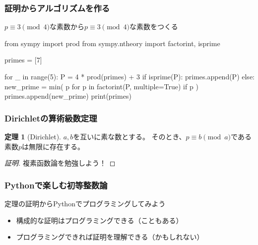 \documentclass[dvipdfmx,11pt,notheorems]{beamer}
\theoremstyle{definition}
\newtheorem{theorem}{定理}
\begin{document}
\begin{frame}[fragile]\frametitle{証明からアルゴリズムを作る}

\begin{block}{$p \equiv 3 \pmod{4}$な素数から$p \equiv 3 \pmod{4}$な素数をつくる}
\begin{pycode}
from sympy import prod
from sympy.ntheory import factorint, isprime

primes = [7]

for _ in range(5):
    P = 4 * prod(primes) + 3
    if isprime(P):
        primes.append(P)
    else:
        new_prime = min(
            p
            for p in factorint(P, multiple=True)
            if p %
        )
        primes.append(new_prime)
print(primes)
\end{pycode}
\end{block}

\end{frame}


\begin{frame}\frametitle{Dirichletの算術級数定理}

\begin{theorem}[Dirichlet]
$a,b$を互いに素な数とする。
そのとき、$p \equiv b \pmod{a}$である素数$p$は無限に存在する。
\end{theorem}

\begin{proof}[証明]
複素函数論を勉強しよう！
\end{proof}

\end{frame}


\begin{frame}\frametitle{Pythonで楽しむ初等整数論}

\begin{block}{定理の証明からPythonでプログラミングしてみよう}
\begin{itemize}
\item 構成的な証明はプログラミングできる（こともある）
\item プログラミングできれば証明を理解できる（かもしれない）
\end{itemize}
\end{block}

\end{frame}
\end{document}
